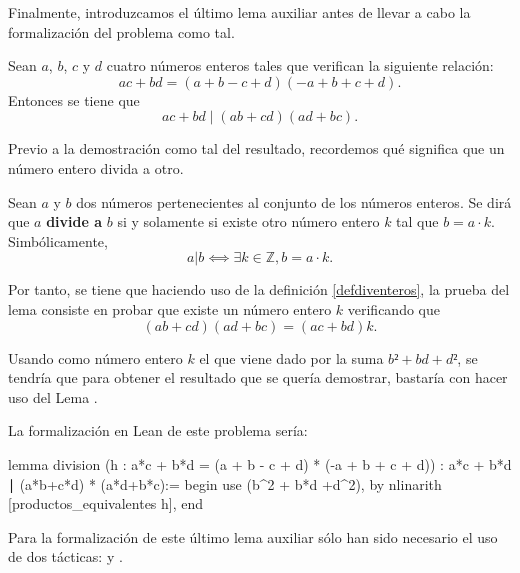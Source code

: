 Finalmente, introduzcamos el último lema auxiliar antes de llevar a cabo la
formalización del problema como tal.

\begin{lema}[division]
  Sean \(a\), \(b\), \(c\) y \(d\) cuatro números enteros tales que
  verifican la siguiente relación:
    \begin{equation}\tag{h}
      ac+bd = (a+b-c+d)(-a+b+c+d).
    \end{equation}
    Entonces se tiene que
    \begin{equation}
      ac+bd ∣ (ab+cd)(ad+bc).
    \end{equation}
\end{lema}

\begin{demostracion}
  Previo a la demostración como tal del resultado, recordemos qué significa que
  un número entero divida a otro.
  \begin{definicion}\label{defdiventeros}
    Sean \(a\) y \(b\) dos números pertenecientes al conjunto de los números
    enteros. Se dirá que  \(a\) \textbf{divide a} \(b\) si y
    solamente si existe otro número entero \(k\) tal que \(b = a · k\).
    Simbólicamente,
    \begin{equation}
    a|b ⟺ ∃ k ∈ ℤ, b = a · k.
    \end{equation}
  \end{definicion}

  Por tanto, se tiene que haciendo uso de la definición \ref{defdiventeros},
  la prueba del lema consiste en probar que existe un número entero \(k\)
  verificando que
  \begin{equation}
    (ab+cd)(ad+bc)=(ac+bd)k.
  \end{equation}
  
  Usando como número entero \(k\) el que viene dado por la suma \(b²+bd+d²\),
  se tendría que para obtener el resultado que se quería demostrar, bastaría con
  hacer uso del Lema \label{q601lemaprod}.
\end{demostracion}

La formalización en Lean de este problema sería:
\begin{leancode}
lemma division
  (h : a*c + b*d = (a + b - c + d) * (-a + b + c + d))
  : a*c + b*d ∣ (a*b+c*d) * (a*d+b*c):=
begin
  use (b^2 + b*d +d^2),
  by nlinarith [productos_equivalentes h],
end
\end{leancode}

Para la formalización de este último lema auxiliar sólo han sido necesario el
uso de dos tácticas:  y .

